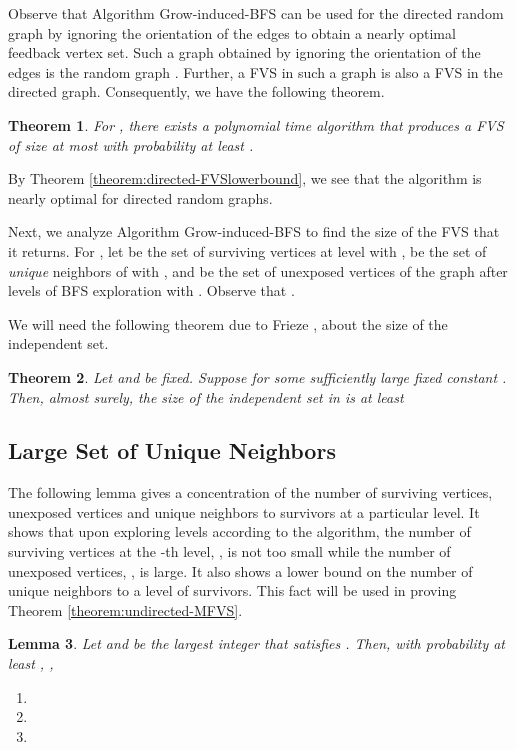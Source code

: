 \documentclass[11pt]{article}
\newtheorem{theorem}{Theorem}
\newtheorem{lemma}[theorem]{Lemma}
\begin{document}
Observe that Algorithm Grow-induced-BFS can be used for the directed random graph  by ignoring the orientation of the edges to obtain a nearly optimal feedback vertex set. Such a graph obtained by ignoring the orientation of the edges is the random graph . Further, a FVS in such a graph is also a FVS in the directed graph. Consequently, we have the following theorem.
\begin{theorem}\label{directed-FVS}
For , there exists a polynomial time algorithm that produces a FVS of size at most  with probability at least .
\end{theorem}
By Theorem \ref{theorem:directed-FVSlowerbound}, we see that the algorithm is nearly optimal for directed random graphs.

Next, we analyze Algorithm Grow-induced-BFS to find the size of the FVS that it returns. For , let
 be the set of surviving vertices at level  with ,
 be the set of \emph{unique} neighbors of  with , and
 be the set of unexposed vertices of the graph after  levels of BFS exploration with . Observe that .


We will need the following theorem due to Frieze \cite{frieze-ind-set}, about the size of the independent set.
\begin{theorem}\cite{frieze-ind-set} \label{theorem:large-ind-set}
Let  and  be fixed. Suppose  for some sufficiently large fixed constant . Then, almost surely, the size of the independent set in  is at least

\end{theorem}


\subsection{Large Set of Unique Neighbors}
The following lemma gives a concentration of the number of surviving vertices, unexposed vertices and unique neighbors to survivors at a particular level. It shows that upon exploring  levels according to the algorithm, the number of surviving vertices at the -th level, , is not too small while the number of unexposed vertices, , is large. It also shows a lower bound on the number of unique neighbors  to a level of survivors. This fact will be used in proving Theorem \ref{theorem:undirected-MFVS}.
\begin{lemma}\label{lemma:largesurvivors}
Let  and  be the largest integer that satisfies .
Then, with probability at least , ,
\begin{enumerate}
\item

\item

\item

\end{enumerate}
\end{lemma}
\end{document}
